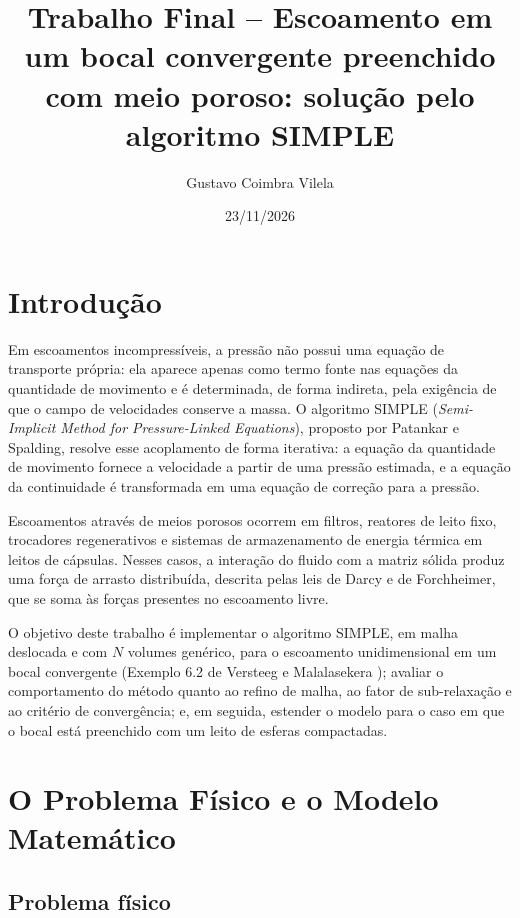 \documentclass[11pt,a4paper]{article}
\title{Trabalho Final -- Escoamento em um bocal convergente preenchido com meio poroso: solução pelo algoritmo SIMPLE}
\author{Gustavo Coimbra Vilela}
\date{23/11/2026}
\begin{document}
\maketitle

\section{Introdução}

Em escoamentos incompressíveis, a pressão não possui uma equação de
transporte própria: ela aparece apenas como termo fonte nas equações da
quantidade de movimento e é determinada, de forma indireta, pela exigência
de que o campo de velocidades conserve a massa. O algoritmo SIMPLE
(\emph{Semi-Implicit Method for Pressure-Linked Equations}), proposto por
Patankar e Spalding, resolve esse acoplamento de forma iterativa: a
equação da quantidade de movimento fornece a velocidade a partir de uma
pressão estimada, e a equação da continuidade é transformada em uma equação
de correção para a pressão.

Escoamentos através de meios porosos ocorrem em filtros, reatores de leito
fixo, trocadores regenerativos e sistemas de armazenamento de energia
térmica em leitos de cápsulas. Nesses casos, a interação do fluido com a
matriz sólida produz uma força de arrasto distribuída, descrita pelas leis
de Darcy e de Forchheimer, que se soma às forças presentes no escoamento
livre.

O objetivo deste trabalho é implementar o algoritmo SIMPLE, em malha
deslocada e com $N$ volumes genérico, para o escoamento unidimensional em um
bocal convergente (Exemplo 6.2 de Versteeg e Malalasekera
\cite{versteeg}); avaliar o comportamento do método quanto ao refino de
malha, ao fator de sub-relaxação e ao critério de convergência; e, em
seguida, estender o modelo para o caso em que o bocal está preenchido com um
leito de esferas compactadas.

\section{O Problema Físico e o Modelo Matemático}

\subsection{Problema físico}
\end{document}
